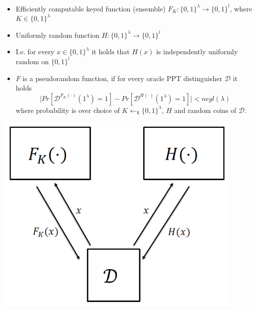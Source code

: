 	
	\begin{definition}\ 
	    \begin{itemize}
	        \item Efficiently computable keyed function (ensemble) $F_K: \{0,1\}^{\lambda} \to \{0,1\}^l$, where $K \in \{0,1\}^{\lambda}$
	        \item Uniformly random function $H: \{0,1\}^{\lambda} \to \{0,1\}^l$
	        \item I.e. for every $x \in \{0,1\}^{\lambda}$ it holds that $H(x)$ is independently uniformly random on $\{0,1\}^l$
	        \item $F$ is a pseudorandom function, if for every oracle PPT distinguisher $\mathcal{D}$ it holds
	        $$\vert Pr[\mathcal{D}^{F_K (\cdot)}(1^{\lambda})=1]-Pr[\mathcal{D}^{H (\cdot)}(1^{\lambda})=1] \vert < negl(\lambda)$$
	        where probability is over choice of $K \leftarrow_{\$} \{0,1\}^{\lambda}$, $H$ and random coins of $\mathcal{D}$.
	    \end{itemize}
	    \begin{center}
			\includegraphics[width=120mm]{Graphics/CPA/prf.png}
		\end{center}
	\end{definition}
	
	
